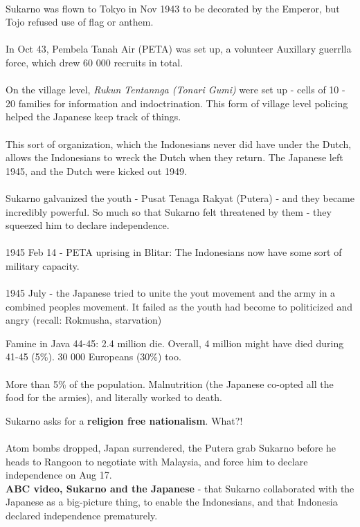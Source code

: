 \documentclass[a4paper]{article}
\begin{document}
\\
Sukarno was flown to Tokyo in Nov 1943 to be decorated by the Emperor, but Tojo refused use of flag or anthem.\\
\\
In Oct 43, Pembela Tanah Air (PETA) was set up, a volunteer Auxillary guerrlla force, which drew 60 000 recruits in total.\\
\\
On the village level, \textit{Rukun Tentannga (Tonari Gumi)} were set up - cells of 10 - 20 families for information and indoctrination. This form of village level policing helped the Japanese keep track of things.\\
\\
This sort of organization, which the Indonesians never did have under the Dutch, allows the Indonesians to wreck the Dutch when they return. The Japanese left 1945, and the Dutch were kicked out 1949.\\
\\
Sukarno galvanized the youth - Pusat Tenaga Rakyat (Putera) - and they became incredibly powerful. So much so that Sukarno felt threatened by them - they squeezed him to declare independence.\\
\\
1945 Feb 14 - PETA uprising in Blitar: The Indonesians now have some sort of military capacity.\\
\\
1945 July - the Japanese tried to unite the yout movement and the army in a combined peoples movement. It failed as the youth had become to politicized and angry (recall: Rokmusha, starvation)
\begin{displayquote}
	Famine in Java 44-45: 2.4 million die. Overall, 4 million might have died during 41-45 (5\%). 30 000 Europeans (30\%) too.\\
	\\
	More than 5\% of the population. Malnutrition (the Japanese co-opted all the food for the armies), and literally worked to death.
\end{displayquote}
Sukarno asks for a \textbf{religion free nationalism}. What?!\\
\\
Atom bombs dropped, Japan surrendered, the Putera grab Sukarno before he heads to Rangoon to negotiate with Malaysia, and force him to declare independence on Aug 17.\\
\textbf{ABC video, Sukarno and the Japanese} - that Sukarno collaborated with the Japanese as a big-picture thing, to enable the Indonesians, and that Indonesia declared independence prematurely.\\
\end{document}
